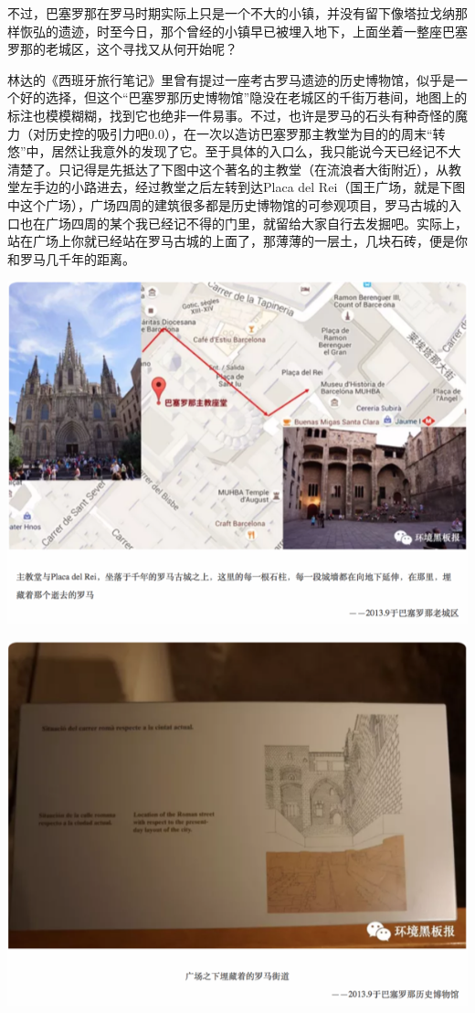 \documentclass[]{book}
\begin{document}
不过，巴塞罗那在罗马时期实际上只是一个不大的小镇，并没有留下像塔拉戈纳那样恢弘的遗迹，时至今日，那个曾经的小镇早已被埋入地下，上面坐着一整座巴塞罗那的老城区，这个寻找又从何开始呢？

林达的《西班牙旅行笔记》里曾有提过一座考古罗马遗迹的历史博物馆，似乎是一个好的选择，但这个``巴塞罗那历史博物馆''隐没在老城区的千街万巷间，地图上的标注也模模糊糊，找到它也绝非一件易事。不过，也许是罗马的石头有种奇怪的魔力（对历史控的吸引力吧0.0），在一次以造访巴塞罗那主教堂为目的的周末``转悠''中，居然让我意外的发现了它。至于具体的入口么，我只能说今天已经记不大清楚了。只记得是先抵达了下图中这个著名的主教堂（在流浪者大街附近），从教堂左手边的小路进去，经过教堂之后左转到达Placa del Rei（国王广场，就是下图中这个广场），广场四周的建筑很多都是历史博物馆的可参观项目，罗马古城的入口也在广场四周的某个我已经记不得的门里，就留给大家自行去发掘吧。实际上，站在广场上你就已经站在罗马古城的上面了，那薄薄的一层土，几块石砖，便是你和罗马几千年的距离。

\includegraphics[width=8.33in]{images/xt13}

\includegraphics[width=8.33in]{images/xt14}
\end{document}
